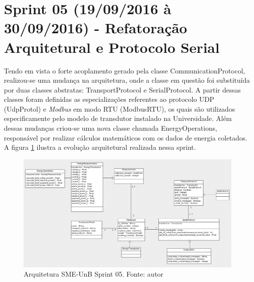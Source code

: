 \section{Sprint 05 (19/09/2016 à 30/09/2016) - Refatoração Arquitetural e Protocolo Serial}
Tendo em vista o forte acoplamento gerado pela classe CommunicationProtocol, realizou-se uma mudança na arquitetura, onde a classe em questão foi substituída por duas classes abstratas: TransportProtocol e SerialProtocol. A partir dessas classes foram definidas as especializações referentes ao protocolo UDP (UdpProtol) e \textit{Modbus} em modo RTU (ModbusRTU), os quais são utilizados especificamente pelo modelo de transdutor instalado na Universidade. Além dessas mudanças criou-se uma nova classe chamada EnergyOperations, responsável por realizar cálculos matemáticos com os dados de energia coletados. A figura \ref{sprint05arq} ilustra a evolução arquitetural realizada nessa sprint.
\begin{figure}[!htpb]
    \centering
    \includegraphics[scale=0.5,angle=90]{figuras/sprint05arq.eps}
    \caption{Arquitetura SME-UnB Sprint 05. Fonte: autor}
    \label{sprint05arq}
\end{figure}


